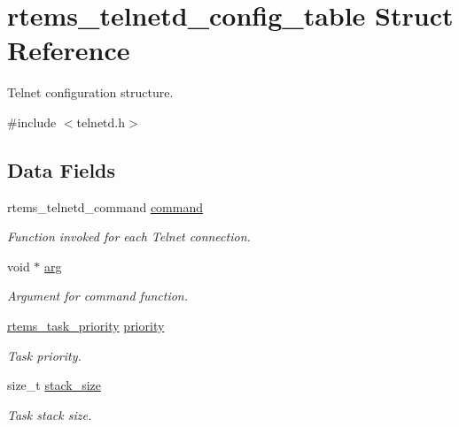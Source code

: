 \hypertarget{structrtems__telnetd__config__table}{}\section{rtems\+\_\+telnetd\+\_\+config\+\_\+table Struct Reference}
\label{structrtems__telnetd__config__table}


Telnet configuration structure.  




{\ttfamily \#include $<$telnetd.\+h$>$}

\subsection*{Data Fields}
\begin{DoxyCompactItemize}
\item 
rtems\+\_\+telnetd\+\_\+command \mbox{\hyperlink{structrtems__telnetd__config__table_a6da89239f61c6c14a3adeb1adc37f65a}{command}}
\begin{DoxyCompactList}\small\item\em Function invoked for each Telnet connection. \end{DoxyCompactList}\item 
\mbox{\label{structrtems__telnetd__config__table_ae2401b60c0a3eaebbfb9233c5e2cbbc4}} 
void $\ast$ \mbox{\hyperlink{structrtems__telnetd__config__table_ae2401b60c0a3eaebbfb9233c5e2cbbc4}{arg}}
\begin{DoxyCompactList}\small\item\em Argument for command function. \end{DoxyCompactList}\item 
\mbox{\hyperlink{group__ClassicTasks_gaa80a0c0938307d1e99d0eb5fee765b47}{rtems\+\_\+task\+\_\+priority}} \mbox{\hyperlink{structrtems__telnetd__config__table_afc49c654a03598318272c5eb028a07cb}{priority}}
\begin{DoxyCompactList}\small\item\em Task priority. \end{DoxyCompactList}\item 
size\+\_\+t \mbox{\hyperlink{structrtems__telnetd__config__table_a2aa8eb79f53b8ef08d330acafa446c75}{stack\+\_\+size}}
\begin{DoxyCompactList}\small\item\em Task stack size. \end{DoxyCompactList}\item 

\end{DoxyCompactItemize}
